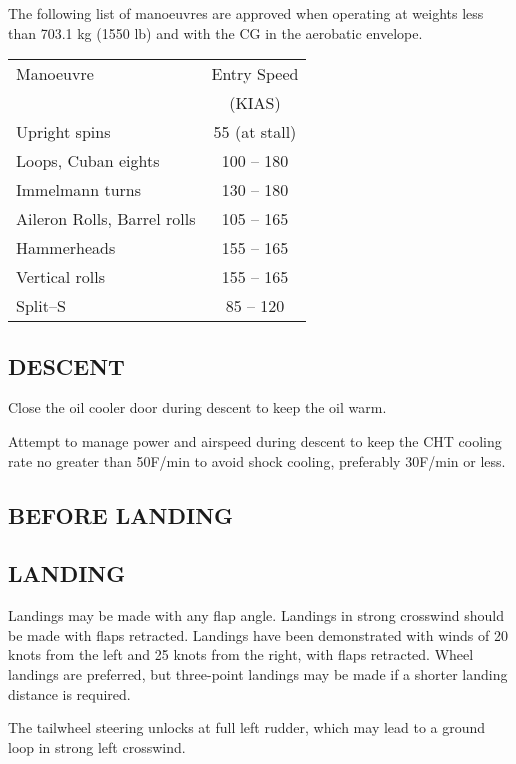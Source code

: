 \begin{Note}
The following list of manoeuvres are approved 
when operating at weights less than 703.1 kg (1550 lb) and with the
CG in the aerobatic envelope. 
\end{Note}

\begin{center}\begin{tabular}{lc}
Manoeuvre&
Entry Speed\tabularnewline
&
(KIAS)\tabularnewline
Upright spins&55 (at stall)\tabularnewline
Loops, Cuban eights&
100 -- 180\tabularnewline
Immelmann turns&
130 -- 180\tabularnewline
Aileron Rolls, Barrel rolls&
105 -- 165\tabularnewline
Hammerheads&
155 -- 165\tabularnewline
Vertical rolls&
155 -- 165\tabularnewline
Split--S&
85 -- 120\tabularnewline
\end{tabular}\end{center}

\subsection{DESCENT}
Close the oil cooler door during descent to keep the oil warm.
\begin{Note} 
Attempt to manage power and airspeed during descent to keep the CHT cooling rate no greater than 50\textdegree F/min to avoid shock cooling, preferably 30\textdegree F/min or less.
\end{Note}


\subsection{BEFORE LANDING}

\subsection{LANDING}
Landings may be made with any flap angle. Landings in strong crosswind should be made with flaps retracted. Landings have been demonstrated with winds of 20 knots from the left and 25 knots from the right, with flaps retracted. Wheel landings are preferred, but three-point landings may be made if a shorter landing distance is required.

\begin{Note}[CAUTION]
The tailwheel steering unlocks at full left rudder, which may lead to a ground loop in strong left crosswind.\end{Note}

